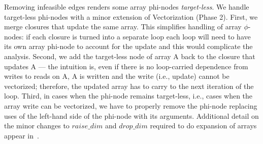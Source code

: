 \begin{comment}
Consider the earlier example. There is a single loop, $i$. Clearly, there is no pair $\underline{i}$ and $\underline{i}'$, where $\underline{i} < \underline{i}'$ that make $\underline{i} = \underline{i}'$
due to the def-use pairs of {\sf A} 6-7 and 6-8.
Therefore, we remove the back edge from 6 to the phi-node 2. Analogously, we remove the back edges from 7 to 3 and from 8 to 4. However, there are many values $\underline{i} < \underline{i'}$ that make $\underline{i} = \underline{i'}-1$ and the back edge from 9 to 5 remains (def-use pairs for {\sf D}). As a result of removing these spurious edges, Vectorization will find that statement 6 is vectorizable. Statements 7, 8 and 9 will correctly appear in the FOR loop.
\end{comment}

Removing infeasible edges renders some array phi-nodes \emph{target-less}. We handle target-less phi-nodes with a minor extension of Vectorization (Phase 2).
First, we merge closures that update the same array. This simplifies handling of array $\phi$-nodes: if each closure is turned into a separate loop
each loop will need to have its own array phi-node to account for the update and this would complicate the analysis.
Second, we add the target-less node of array {\sf A} back to the closure that updates {\sf A} ---
the intuition is, even if there is no loop-carried dependence from writes to reads on {\sf A}, {\sf A} is written and the write (i.e., update) cannot be vectorized;
therefore, the updated array has to carry to the next iteration of the loop. Third, in cases when the phi-node remains target-less, i.e., cases when the
array write can be vectorized, we have to properly remove the phi-node replacing uses of the left-hand side of the phi-node with its arguments.
Additional detail on the minor changes to $\mathit{raise\_dim}$ and $\mathit{drop\_dim}$ required to do expansion of arrays appear in~\cite{Anon_TR}.



